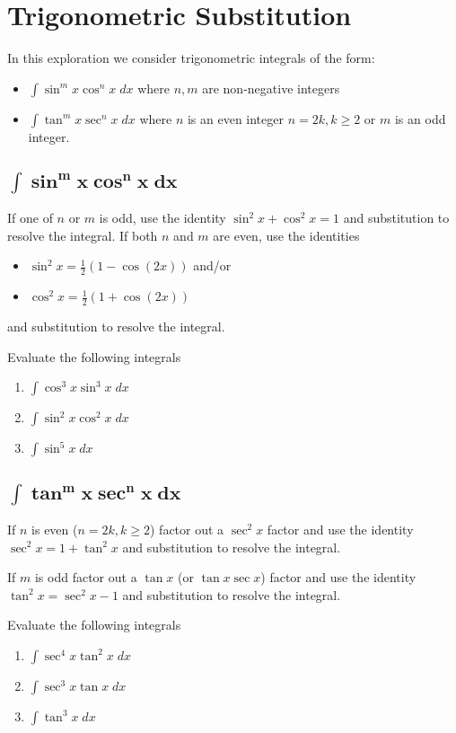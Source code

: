 \documentclass[12pt,letterpaper,fleqn]{article}
\theoremstyle{definition}
\begin{document}
\section*{Trigonometric Substitution}
In this exploration we consider trigonometric integrals of the form:
\begin{itemize}
 \item $\int\sin^m x \cos^n x\;dx$ where $n, m$ are non-negative integers
 \item $\int\tan^m x \sec^n x\;dx$ where $n$ is an even integer $n = 2k, k\geq 2$ or $m$ is an odd integer.
\end{itemize}
\subsection*{$\pmb{\int\sin^m x \cos^n x\;dx}$}
If one of $n$ or $m$ is odd, use the identity $\sin^2 x + \cos^2 x = 1$ and substitution to resolve the integral. If both $n$ and $m$ are even, use the identities
\begin{itemize}
 \item $\sin^2 x = \frac{1}{2}(1 - \cos(2x))$ and/or
 \item $\cos^2 x = \frac{1}{2}(1 + \cos(2x))$
\end{itemize}
and substitution to resolve the integral.

Evaluate the following integrals
\begin{enumerate}
 \item $\int\cos^3 x\sin^3 x\;dx$
 \item $\int\sin^2 x\cos^2 x\;dx$
 \item $\int\sin^5 x\;dx$
\end{enumerate}

\subsection*{$\pmb{\int\tan^m x \sec^n x\;dx}$}
If $n$ is even ($n = 2k, k\geq 2$) factor out a $\sec^2 x$ factor and use the identity $\sec^2 x = 1 + \tan^2 x$ and substitution to resolve the integral.

If $m$ is odd factor out a $\tan x$ (or $\tan x\sec x$) factor and use the identity $\tan^2 x = \sec^2 x - 1$ and substitution to resolve the integral.

Evaluate the following integrals
\begin{enumerate}[resume]
 \item $\int\sec^4 x\tan^2 x\;dx$
 \item $\int\sec^3 x\tan x\;dx$
 \item $\int\tan^3 x\;dx$
\end{enumerate}
\end{document}

